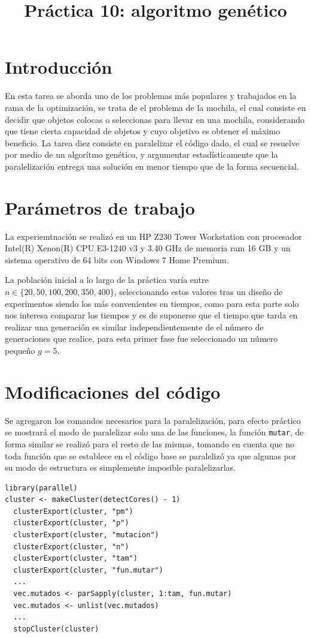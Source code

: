 \documentclass[a4paper]{article}
\title{Práctica 10: algoritmo genético}
\begin{document}
\maketitle

\section{Introducci\'on}
En esta tarea se aborda uno de los problemas más populares y trabajados en la rama de la optimización, se trata de el problema de la mochila, el cual consiste en decidir que objetos colocas o seleccionas para llevar en una mochila, considerando que tiene cierta capacidad de objetos y cuyo objetivo es obtener el máximo beneficio. La tarea diez consiste en paralelizar el código dado, el cual se resuelve por medio de un algorítmo genético, y argumentar estadísticamente que la paralelización entrega una solución en menor tiempo que de la forma secuencial.

\section{Par\'ametros de trabajo}
La experiemtnación se realizó en un HP Z230 Tower Workstation con procesador Intel(R) Xenon(R) CPU E3-1240 v3 y 3.40 GHz de memoria ram 16 GB y un sistema operativo de 64 bits con Windows 7 Home Premium.

La población inicial a lo largo de la práctica varía entre $n\in\{20,50,100,200,350,400\}$, seleccionando estos valores tras un diseño de experimentos siendo los más convenientes en tiempos, como para esta parte solo nos interesa comparar los tiempos y es de suponerse que el tiempo que tarda en realizar una generación es similar independientemente de el número de generaciones que realice, para esta primer fase fue seleccionado un número pequeño $g=5$.


\section{Modificaciones del código}
Se agregaron los comandos necesarios para la paralelización, para efecto práctico se mostrará el modo de paralelizar solo una de las funciones, la función \texttt{mutar}, de forma similar se realizó para el resto de las mismas, tomando en cuenta que no toda función que se establece en el código base se paralelizó ya que algunas por su modo de estructura es simplemente imposible paralelizarlas. 

\begin{lstlisting}[frame=single]
library(parallel)
cluster <- makeCluster(detectCores() - 1)
  clusterExport(cluster, "pm")
  clusterExport(cluster, "p")
  clusterExport(cluster, "mutacion")
  clusterExport(cluster, "n")
  clusterExport(cluster, "tam")
  clusterExport(cluster, "fun.mutar")
  ...
  vec.mutados <- parSapply(cluster, 1:tam, fun.mutar)
  vec.mutados <- unlist(vec.mutados)
  ...
  stopCluster(cluster)
\end{lstlisting}
\end{document}
